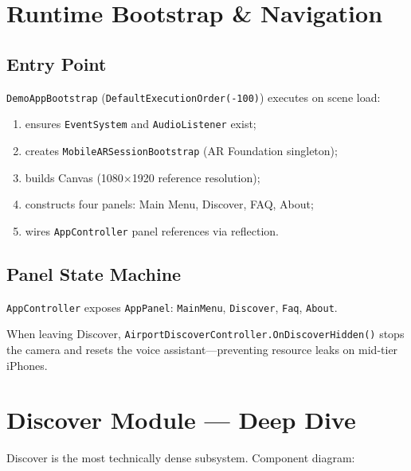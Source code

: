 \documentclass[11pt,a4paper]{article}
\begin{document}
\section{Runtime Bootstrap \& Navigation}

\subsection{Entry Point}

\texttt{DemoAppBootstrap} (\texttt{DefaultExecutionOrder(-100)}) executes on scene load:

\begin{enumerate}[noitemsep]
    \item ensures \texttt{EventSystem} and \texttt{AudioListener} exist;
    \item creates \texttt{MobileARSessionBootstrap} (AR Foundation singleton);
    \item builds Canvas (1080$\times$1920 reference resolution);
    \item constructs four panels: Main Menu, Discover, FAQ, About;
    \item wires \texttt{AppController} panel references via reflection.
\end{enumerate}

\subsection{Panel State Machine}

\texttt{AppController} exposes \texttt{AppPanel}: \texttt{MainMenu}, \texttt{Discover}, \texttt{Faq}, \texttt{About}.

When leaving Discover, \texttt{AirportDiscoverController.OnDiscoverHidden()} stops the camera and resets the voice assistant---preventing resource leaks on mid-tier iPhones.

\section{Discover Module --- Deep Dive}

Discover is the most technically dense subsystem. Component diagram:
\end{document}
